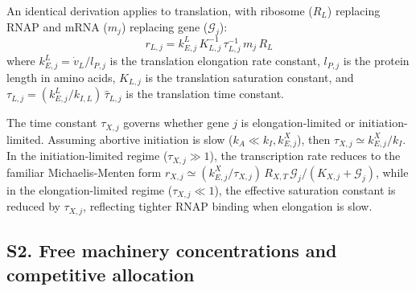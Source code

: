 An identical derivation applies to translation, with ribosome ($R_L$) replacing RNAP and mRNA ($m_j$) replacing gene ($\mathcal{G}_j$):
\begin{equation}
\boxed{r_{L,j} = k_{E,j}^L\,K_{L,j}^{-1}\,\tau_{L,j}^{-1}\,m_j\,R_L}
\label{eq:rL_general}
\end{equation}
where $k_{E,j}^L = \dot{v}_L / l_{P,j}$ is the translation elongation rate constant, $l_{P,j}$ is the protein length in amino acids, $K_{L,j}$ is the translation saturation constant, and $\tau_{L,j} = (k_{E,j}^L / k_{I,L})\,\hat{\tau}_{L,j}$ is the translation time constant.

The time constant $\tau_{X,j}$ governs whether gene $j$ is elongation-limited or initiation-limited. Assuming abortive initiation is slow ($k_A \ll k_I, k_{E,j}^X$), then $\tau_{X,j} \simeq k_{E,j}^X / k_I$. In the initiation-limited regime ($\tau_{X,j} \gg 1$), the transcription rate reduces to the familiar Michaelis-Menten form $r_{X,j} \simeq (k_{E,j}^X/\tau_{X,j})\,R_{X,T}\,\mathcal{G}_j/(K_{X,j} + \mathcal{G}_j)$, while in the elongation-limited regime ($\tau_{X,j} \ll 1$), the effective saturation constant is reduced by $\tau_{X,j}$, reflecting tighter RNAP binding when elongation is slow.

\subsection*{S2. Free machinery concentrations and competitive allocation}

